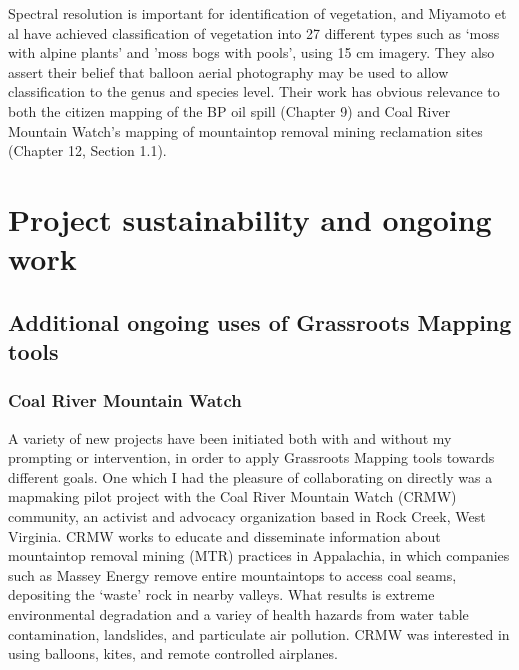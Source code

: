 \documentclass[11pt]{report}
\begin{document}

Spectral resolution is important for identification of vegetation, and Miyamoto et al have achieved classification of vegetation into 27 different types such as `moss with alpine plants' and 'moss bogs with pools', using 15 cm imagery. They also assert their belief that balloon aerial photography may be used to allow classification to the genus and species level. \cite{miyamoto2004use} Their work has obvious relevance to both the citizen mapping of the BP oil spill (Chapter 9) and Coal River Mountain Watch's mapping of mountaintop removal mining reclamation sites (Chapter 12, Section 1.1).

\chapter{Project sustainability and ongoing work}

\section{Additional ongoing uses of Grassroots Mapping tools}

\subsection{Coal River Mountain Watch}

A variety of new projects have been initiated both with and without my prompting or intervention, in order to apply Grassroots Mapping tools towards different goals. One which I had the pleasure of collaborating on directly was a mapmaking pilot project with the Coal River Mountain Watch (CRMW) community, an activist and advocacy organization based in Rock Creek, West Virginia. CRMW works to educate and disseminate information about mountaintop removal mining (MTR) practices in Appalachia, in which companies such as Massey Energy remove entire mountaintops to access coal seams, depositing the `waste' rock in nearby valleys. What results is extreme environmental degradation and a variey of health hazards from water table contamination, landslides, and particulate air pollution. CRMW was interested in using balloons, kites, and remote controlled airplanes. 

\end{document}
